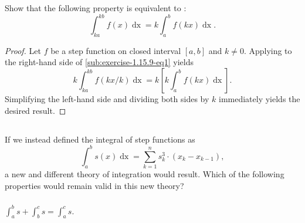 \documentclass{report}
\begin{document}
Show that the following property is equivalent to
  :
  \begin{equation}
    \label{sub:exercise-1.15.9-eq1}
    \int_{ka}^{kb} f(x) \mathop{dx} = k \int_a^b f(kx) \mathop{dx}.
  \end{equation}

\begin{proof}

  Let $f$ be a step function on closed interval $[a, b]$ and $k \neq 0$.
  Applying  to the
    right-hand side of \eqref{sub:exercise-1.15.9-eq1} yields
    $$k\int_{ka}^{kb} f(kx / k) \mathop{dx} =
      k\left[k\int_a^b f(kx) \mathop{dx}\right].$$
  Simplifying the left-hand side and dividing both sides by $k$ immediately
    yields the desired result.

\end{proof}

\subsection{}%
\label{sub:exercise-1.15.11}

If we instead defined the integral of step functions as
  \begin{equation*}
    \label{sub:exercise-1.15.11-eq1}
    \int_a^b s(x) \mathop{dx} = \sum_{k=1}^n s_k^3 \cdot (x_k - x_{k-1}),
  \end{equation*}
  a new and different theory of integration would result.
Which of the following properties would remain valid in this new theory?

\subsubsection{}%
\label{ssub:exercise-1.15.11a}

$\int_a^b s + \int_b^c s = \int_a^c s$.

\end{document}
